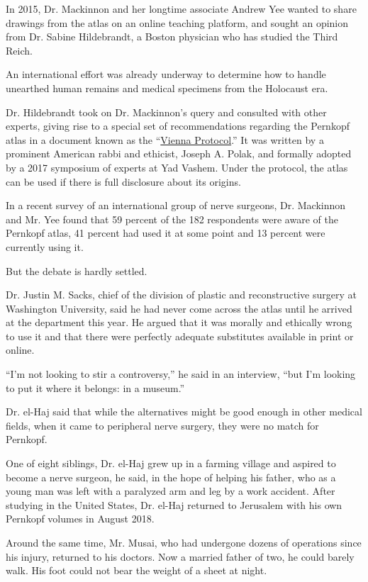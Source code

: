 In 2015, Dr. Mackinnon and her longtime associate Andrew Yee wanted to
share drawings from the atlas on an online teaching platform, and sought
an opinion from Dr. Sabine Hildebrandt, a Boston physician who has
studied the Third Reich.

An international effort was already underway to determine how to handle
unearthed human remains and medical specimens from the Holocaust era.

Dr. Hildebrandt took on Dr. Mackinnon's query and consulted with other
experts, giving rise to a special set of recommendations regarding the
Pernkopf atlas in a document known as the
``\href{https://www.bu.edu/jewishstudies/files/2018/08/HOW-TO-DEAL-WITH-HOLOCAUST-ERA-REMAINS.FINAL_.pdf}{Vienna
Protocol}.'' It was written by a prominent American rabbi and ethicist,
Joseph A. Polak, and formally adopted by a 2017 symposium of experts at
Yad Vashem. Under the protocol, the atlas can be used if there is full
disclosure about its origins.

In a recent survey of an international group of nerve surgeons, Dr.
Mackinnon and Mr. Yee found that 59 percent of the 182 respondents were
aware of the Pernkopf atlas, 41 percent had used it at some point and 13
percent were currently using it.

But the debate is hardly settled.

Dr. Justin M. Sacks, chief of the division of plastic and reconstructive
surgery at Washington University, said he had never come across the
atlas until he arrived at the department this year. He argued that it
was morally and ethically wrong to use it and that there were perfectly
adequate substitutes available in print or online.

``I'm not looking to stir a controversy,'' he said in an interview,
``but I'm looking to put it where it belongs: in a museum.''

Dr. el-Haj said that while the alternatives might be good enough in
other medical fields, when it came to peripheral nerve surgery, they
were no match for Pernkopf.

One of eight siblings, Dr. el-Haj grew up in a farming village and
aspired to become a nerve surgeon, he said, in the hope of helping his
father, who as a young man was left with a paralyzed arm and leg by a
work accident. After studying in the United States, Dr. el-Haj returned
to Jerusalem with his own Pernkopf volumes in August 2018.

Around the same time, Mr. Musai, who had undergone dozens of operations
since his injury, returned to his doctors. Now a married father of two,
he could barely walk. His foot could not bear the weight of a sheet at
night.

